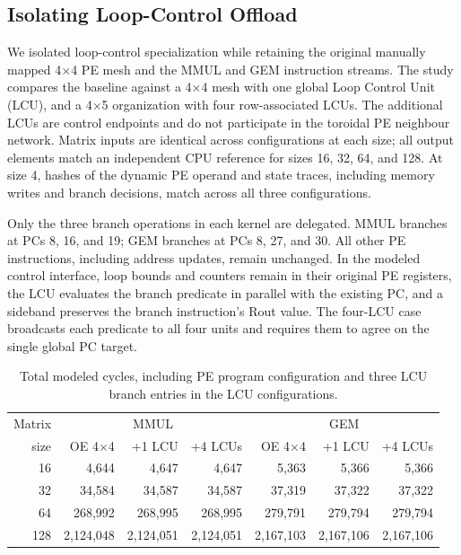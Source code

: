 \subsection{Isolating Loop-Control Offload}
\label{subsec:lcu-loop-control}

We isolated loop-control specialization while retaining the original manually
mapped 4$\times$4 PE mesh and the MMUL and GEM instruction streams. The study
compares the baseline against a 4$\times$4 mesh with one global Loop Control
Unit (LCU), and a 4$\times$5 organization with four row-associated LCUs. The
additional LCUs are control endpoints and do not participate in the toroidal
PE neighbour network. Matrix inputs are identical across configurations at
each size; all output elements match an independent CPU reference for sizes
16, 32, 64, and 128. At size 4, hashes of the dynamic PE operand and state
traces, including memory writes and branch decisions, match across all three
configurations.

Only the three branch operations in each kernel are delegated. MMUL branches
at PCs 8, 16, and 19; GEM branches at PCs 8, 27, and 30. All other PE
instructions, including address updates, remain unchanged. In the modeled
control interface, loop bounds and counters remain in their original PE
registers, the LCU evaluates the branch predicate in parallel with the
existing PC, and a sideband preserves the branch instruction's Rout value.
The four-LCU case broadcasts each predicate to all four units and requires
them to agree on the single global PC target.

\begin{table}[t]
\centering
\caption{Total modeled cycles, including PE program configuration and three
LCU branch entries in the LCU configurations.}
\label{tab:lcu-same-mesh-cycles}
\begin{tabular}{r|rrr|rrr}
\hline
Matrix & \multicolumn{3}{c|}{MMUL} & \multicolumn{3}{c}{GEM} \\
size & OE 4$\times$4 & +1 LCU & +4 LCUs & OE 4$\times$4 & +1 LCU & +4 LCUs \\
\hline
16  & 4,644 & 4,647 & 4,647 & 5,363 & 5,366 & 5,366 \\
32  & 34,584 & 34,587 & 34,587 & 37,319 & 37,322 & 37,322 \\
64  & 268,992 & 268,995 & 268,995 & 279,791 & 279,794 & 279,794 \\
128 & 2,124,048 & 2,124,051 & 2,124,051 & 2,167,103 & 2,167,106 & 2,167,106 \\
\hline
\end{tabular}
\end{table}

